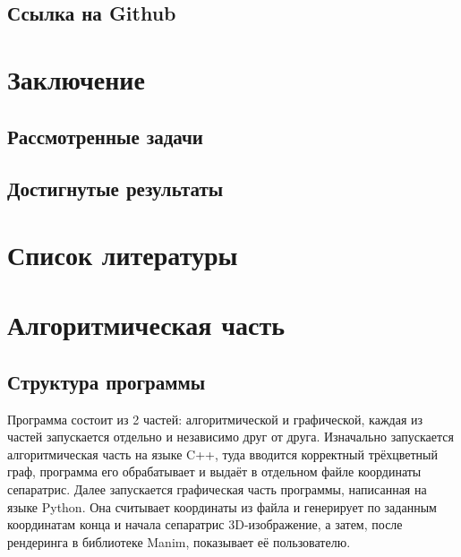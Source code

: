 	\subsection{Ссылка на Github}
	
	\section{Заключение}
	
	\subsection{Рассмотренные задачи}
	
	\subsection{Достигнутые результаты}
	
	\section{Список литературы}
	
	\section{Алгоритмическая часть}
	\subsection{Структура программы}
	\hspace{0.5 cm} Программа состоит из 2 частей: алгоритмической и графической, каждая из частей запускается отдельно и независимо друг от друга. Изначально запускается алгоритмическая часть на языке C++, туда вводится корректный трёхцветный граф, программа его обрабатывает и выдаёт в отдельном файле координаты сепаратрис. Далее запускается графическая часть программы, написанная на языке Python. Она считывает координаты из файла и генерирует по заданным координатам конца и начала сепаратрис 3D-изображение, а затем, после рендеринга в библиотеке Manim, показывает её пользователю.

